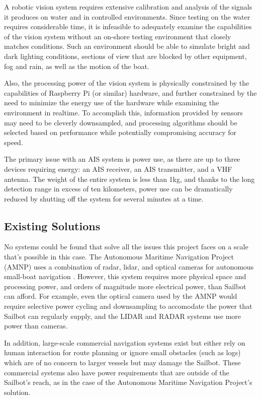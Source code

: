 A robotic vision system requires extensive calibration and analysis of the signals it produces on water and in controlled environments. Since testing on the water requires considerable time, it is infeasible to adequately examine the capabilities of the vision system without an on-shore testing environment that closely matches conditions. Such an environment should be able to simulate bright and dark lighting conditions, sections of view that are blocked by other equipment, fog and rain, as well as the motion of the boat.

Also, the processing power of the vision system is physically constrained by the capabilities of Raspberry Pi (or similar) hardware, and further constrained by the need to minimize the energy use of the hardware while examining the environment in realtime. To accomplish this, information provided by sensors may need to be cleverly downsampled, and processing algorithms should be selected based on performance while potentially compromising accuracy for speed.

The primary issue with an AIS system is power use, as there are up to three devices requiring energy: an AIS receiver, an AIS transmitter, and a VHF antenna. The weight of the entire system is less than 1kg, and thanks to the long detection range in excess of ten kilometers, power use can be dramatically reduced by shutting off the system for several minutes at a time.


\subsection{\label{sec:intro:existing-solutions}Existing Solutions}
No systems could be found that solve all the issues this project faces on a scale that's possible in this case. The Autonomous Maritime Navigation Project (AMNP) uses a combination of radar, lidar, and optical cameras for autonomous small-boat navigation \cite{AMN}. However, this system requires more physical space and processing power, and orders of magnitude more electrical power, than Sailbot can afford. For example, even the optical camera used by the AMNP would require selective power cycling and downsampling to accomodate the power that Sailbot can regularly supply, and the LIDAR and RADAR systems use more power than cameras.

In addition, large-scale commercial navigation systems exist but either rely on human interaction for route planning or ignore small obstacles (such as logs) which are of no concern to larger vessels but may damage the Sailbot. These commercial systems also have power requirements that are outside of the Sailbot's reach, as in the case of the Autonomous Maritime Navigation Project's solution. 


